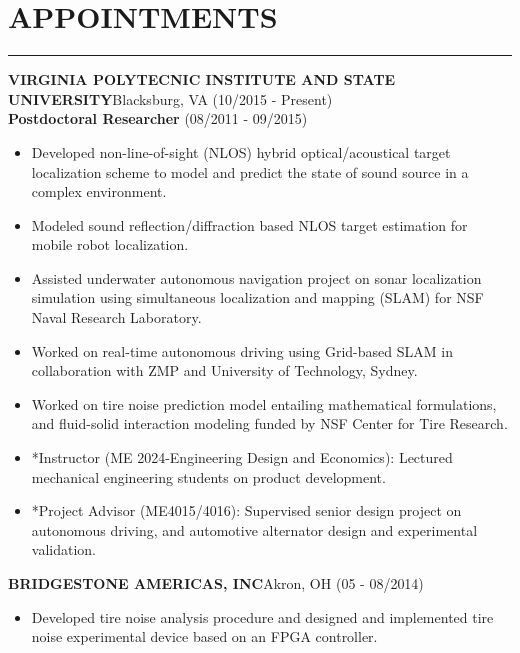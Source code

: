 \documentclass[10pt,letterpaper]{article}
\begin{document}
\section*{APPOINTMENTS}
\vspace{-2mm}
\hrule
\MakeUppercase{\bf Virginia Polytecnic Institute and State University}\hfill{Blacksburg, VA }{(10/2015 - Present)}\\
{\bfseries Postdoctoral Researcher}
\hspace{5mm}{\bfseries Graduate Research Assistant/ *Graduate Teaching Assistant}\hfill {(08/2011 - 09/2015)}\\
\begin{itemize}
\item Developed non-line-of-sight (NLOS) hybrid optical/acoustical target localization scheme to model and predict the state of sound source in a complex environment.
\item Modeled sound reflection/diffraction based NLOS target estimation for mobile robot localization.
\item Assisted underwater autonomous navigation project on sonar localization simulation using simultaneous localization and mapping (SLAM) for NSF Naval Research Laboratory.
\item Worked on real-time autonomous driving using Grid-based SLAM in collaboration with ZMP and University of Technology, Sydney.
\item Worked on tire noise prediction model entailing mathematical formulations, and fluid-solid interaction modeling funded by NSF Center for Tire Research.
\item *Instructor (ME 2024-Engineering Design and Economics): Lectured mechanical engineering students on product development.
\item *Project Advisor (ME4015/4016): Supervised senior design project on autonomous driving, and automotive alternator design and experimental validation. 
\end{itemize}

\MakeUppercase{\bf Bridgestone Americas, Inc}\hfill{Akron, OH}{ (05 - 08/2014)}\\
\hspace{5mm}{\bf Advanced Tire Technology - Research intern}
\begin{itemize}
\item Developed tire noise analysis procedure and designed and implemented tire noise experimental device based on an FPGA controller.
\end{itemize}
\end{document}
